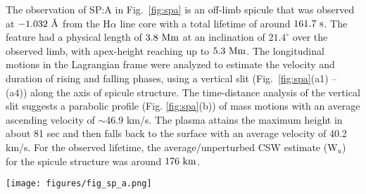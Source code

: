 \documentclass[12pt]{ociamthesis}
\newcommand{\degs}{^{\circ}}
\newcommand{\angstrom}{\textup{\AA}}
\begin{document}
The observation of SP:A in Fig.~\ref{fig:spa} is an off-limb spicule that was observed at $-1.032~\angstrom$ from the H$\alpha$ line core with a total lifetime of around $161.7~\rm{s}$. The feature had a physical length of $3.8~\rm{Mm}$ at an inclination of $21.4\degs$ over the observed limb, with apex-height reaching up to $5.3~\rm{Mm}$. The longitudinal motions in the Lagrangian frame were analyzed to estimate the velocity and duration of rising and falling phases, using a vertical slit (Fig.~\ref{fig:spa}(a1) – (a4)) along the axis of spicule structure. The time-distance analysis of the vertical slit suggests a parabolic profile (Fig. \ref{fig:spa}(b)) of mass motions with an average ascending velocity of $\sim$46.9 km/s. The plasma attains the maximum height in about 81 sec and then falls back to the surface with an average velocity of 40.2 km/s. For the observed lifetime, the average/unperturbed CSW estimate (W$_{u}$) for the spicule structure was around $176~\rm{km}$.
\begin{figure*}
\texttt{[image: figures/fig\_sp\_a.png]}
\caption{Panels (a1) – (a4) show the temporal evolution of candidate spicule feature (SP:A) in H$\alpha$ passband at four instances, with positions of vertical (cyan) and horizontal (yellow) slits used for the estimation of field-aligned mass flows and CSW respectively. Panel (b) shows the time-distance plot from the vertical slit on the spicule, highlighting the rise- and fall-phases of field-aligned mass flow. The maximum height attained by the visible plasma is marked with the ‘+’ symbol, along with estimated velocities (+46.9 km/s, 40.25 km/s). Bottom panel (c) shows an example of Gaussian fit for intensity magnitudes for horizontal slit location (marked as a yellow line on (a1) – (a4)), with error bars, estimated as the standard deviation for intensity values. The vertical black line marks the position of the amplitude of Gaussian fit, while shaded-regions mark average/unperturbed width (W$_{u}$) during spicule lifetime and perturbed/instantaneous width (W). This figure and analysis its encapsulates was produced by Dr. Sharma.}
\label{fig:spa} 
\end{figure*}
\end{document}
